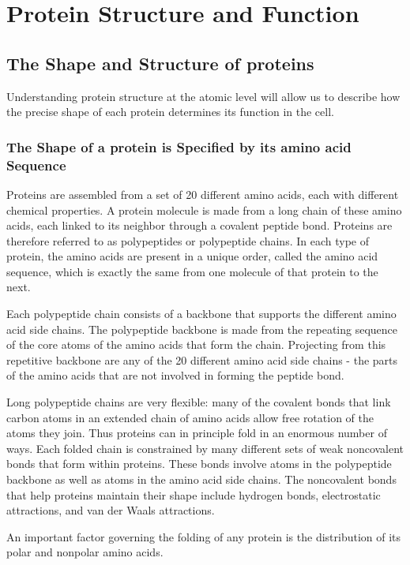 \chapter{Protein Structure and Function}

\section{The Shape and Structure of proteins}

Understanding protein
structure at the atomic level will allow us to describe how the precise
shape of each protein determines its function in the cell.

\subsection{The Shape of a protein is Specified by its amino acid Sequence}

Proteins are assembled from a set of 20 different amino acids, each with different chemical properties. A protein
molecule is made from a long chain of these amino acids, each linked
to its neighbor through a covalent peptide bond. Proteins
are therefore referred to as polypeptides or polypeptide chains. In each
type of protein, the amino acids are present in a unique order, called the
amino acid sequence, which is exactly the same from one molecule
of that protein to the next.

Each polypeptide chain consists of a backbone that supports the different
amino acid side chains. The polypeptide backbone is made from
the repeating sequence of the core atoms of the amino acids that form
the chain. Projecting from this repetitive backbone are any of the 20 different
amino acid side chains - the parts of the amino acids that are not
involved in forming the peptide bond.

Long polypeptide chains are very flexible: many of the covalent bonds
that link carbon atoms in an extended chain of amino acids allow free
rotation of the atoms they join. Thus proteins can in principle fold in an
enormous number of ways. Each folded chain is constrained by many different
sets of weak noncovalent bonds that form within proteins. These
bonds involve atoms in the polypeptide backbone as well as atoms in
the amino acid side chains. The noncovalent bonds that help proteins
maintain their shape include hydrogen bonds, electrostatic attractions,
and van der Waals attractions.

An important factor governing the folding of any protein is the distribution
of its polar and nonpolar amino acids.

